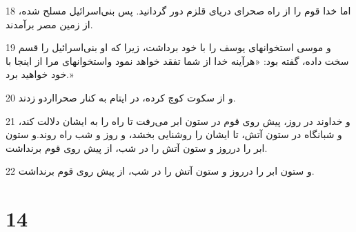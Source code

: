 \par 18 اما خدا قوم را از راه صحرای دریای قلزم دور گردانید. پس بنی‌اسرائیل مسلح شده، از زمین مصر برآمدند.
\par 19 و موسی استخوانهای یوسف را با خود برداشت، زیرا که او بنی‌اسرائیل را قسم سخت داده، گفته بود: «هرآینه خدا از شما تفقد خواهد نمود واستخوانهای مرا از اینجا با خود خواهید برد.»
\par 20 و از سکوت کوچ کرده، در ایتام به کنار صحرااردو زدند.
\par 21 و خداوند در روز، پیش روی قوم در ستون ابر می‌رفت تا راه را به ایشان دلالت کند، و شبانگاه در ستون آتش، تا ایشان را روشنایی بخشد، و روز و شب راه روند.و ستون ابر را درروز و ستون آتش را در شب، از پیش روی قوم برنداشت.
\par 22 و ستون ابر را درروز و ستون آتش را در شب، از پیش روی قوم برنداشت.
 
\chapter{14}

